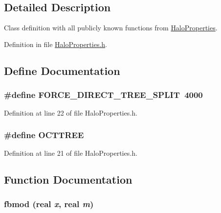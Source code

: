\subsection{Detailed Description}
Class definition with all publicly known functions from \hyperlink{classHaloProperties}{HaloProperties}. 

Definition in file \hyperlink{HaloProperties_8h_source}{HaloProperties.h}.



\subsection{Define Documentation}
\subsubsection[{FORCE\_\-DIRECT\_\-TREE\_\-SPLIT}]{\setlength{\rightskip}{0pt plus 5cm}\#define FORCE\_\-DIRECT\_\-TREE\_\-SPLIT~4000}\label{HaloProperties_8h_aeba9909ecec48c05016e48aec42a9469}


Definition at line 22 of file HaloProperties.h.

\subsubsection[{OCTTREE}]{\setlength{\rightskip}{0pt plus 5cm}\#define OCTTREE}\label{HaloProperties_8h_a690ba77d26036cf5527579144de3086b}


Definition at line 21 of file HaloProperties.h.



\subsection{Function Documentation}
\subsubsection[{fbmod}]{ fbmod ({\bf real} {\em x}, \/  {\bf real} {\em m})}\label{HaloProperties_8h_a899f0547561b988f5ed4f2ad3e834cbf}


